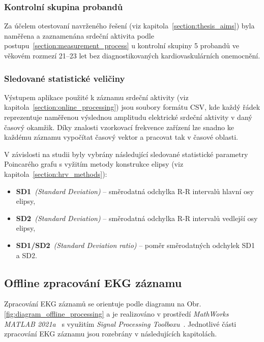 \subsubsection{Kontrolní skupina probandů}
\label{section:probands}
Za účelem otestovaní navrženého řešení (viz kapitola~\ref{section:thesis_aims}) byla naměřena a
zaznamenána srdeční aktivita podle postupu~\ref{section:measurement_process} u
kontrolní skupiny 5 probandů ve věkovém rozmezí 21--23 let bez diagnostikovaných
kardiovaskulárních onemocnění.

\subsubsection{Sledované statistické veličiny}
\label{section:selected_stats_vals}
Výstupem aplikace použité k záznamu srdeční aktivity (viz kapitola~\ref{section:online_processing}) jsou soubory formátu CSV,
kde každý řádek reprezentuje naměřenou výslednou amplitudu elektrické srdeční
aktivity v daný časový okamžik. Díky znalosti vzorkovací frekvence zařízení lze
snadno ke každému záznamu vypočítat časový vektor a pracovat tak v časové
oblasti.

V závislosti na studii byly vybrány následující sledované statistické parametry
Poincarého grafu s vyžitím metody konstrukce elipsy (viz
kapitola~\ref{section:hrv_methods}):
\begin{itemize}[noitemsep]
    \item \textbf{SD1}~\textit{(Standard Deviation)} -- směrodatná odchylka R-R
          intervalů hlavní osy elipsy,
    \item \textbf{SD2}~\textit{(Standard Deviation)} -- směrodatná odchylka R-R
          intervalů vedlejší osy elipsy,
    \item \textbf{SD1/SD2}~\textit{(Standard Deviation ratio)} -- poměr směrodatných odchylek SD1 a SD2.
\end{itemize}

\subsection{Offline zpracování EKG záznamu}
\label{section:offline_processing}
Zpracování EKG záznamů se orientuje podle diagramu na Obr.
\ref{fig:diagram_offline_processing} a je realizováno v prostředí 
\textit{MathWorks MATLAB 2021a}~\cite{MATLAB} s využitím \textit{Signal Processing
Toolboxu}~\cite{matlabSPT}. Jednotlivé části zpracování EKG záznamu jsou rozebrány v
následujících kapitolách.

